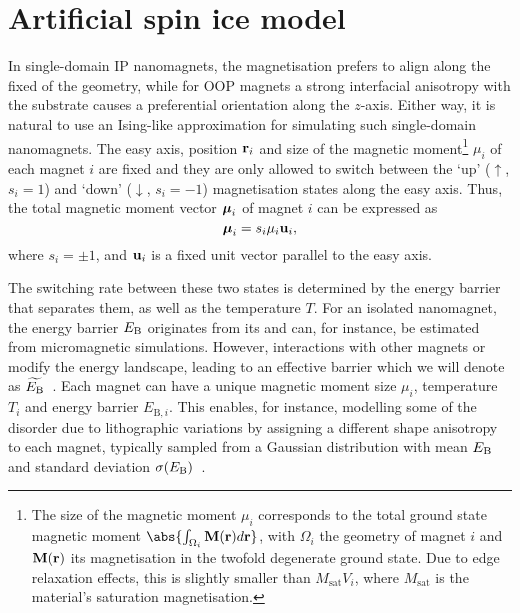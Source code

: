 \newpage
\section{Artificial spin ice model}
In single-domain IP nanomagnets, the magnetisation prefers to align along the fixed  of the geometry, while for OOP magnets a strong interfacial anisotropy with the substrate causes a preferential orientation along the $z$-axis.
Either way, it is natural to use an Ising-like approximation for simulating such single-domain nanomagnets.
The easy axis, position $\boldsymbol{\mathbf{r}}_i$ and size of the magnetic moment\footnote{
	\label{fn:2:moment_integral}
	The size of the magnetic moment $\mu_i$ corresponds to the total ground state magnetic moment $\abs{\int_{\Omega_i} \vc{M}(\vc{r})d\vc{r}}$, with $\Omega_i$ the geometry of magnet $i$ and $\boldsymbol{\mathbf{M}}(\boldsymbol{\mathbf{r}})$ its magnetisation in the twofold degenerate ground state.
	Due to edge relaxation effects, this is slightly smaller than $M_\mathrm{sat} V_i$, where $M_\mathrm{sat}$ is the material's saturation magnetisation.
} $\mu_i$ of each magnet $i$ are fixed and they are only allowed to switch between the `up' ($\uparrow$, $s_i=1$) and `down' ($\downarrow$, $s_i=-1$) magnetisation states along the easy axis.
Thus, the total magnetic moment vector $\boldsymbol{\mathbf{\mu}}_i$ of magnet $i$ can be expressed as
\begin{equation}
	\boldsymbol{\mathbf{\mu}}_i = s_i \mu_i \boldsymbol{\mathbf{u}}_i \mathrm{,}
\end{equation}
where $s_i = \pm 1$, and $\boldsymbol{\mathbf{u}}_i$ is a fixed unit vector parallel to the easy axis. \par
The switching rate between these two states is determined by the energy barrier that separates them, as well as the temperature $T$.
For an isolated nanomagnet, the energy barrier $E_\mathrm{B}$ originates from its  and can, for instance, be estimated from micromagnetic simulations.
However, interactions with other magnets or  modify the energy landscape, leading to an effective barrier which we will denote as $\widetilde{E_\mathrm{B}}$~\cite{leo2021chiral}.
Each magnet can have a unique magnetic moment size $\mu_i$, temperature $T_i$ and energy barrier $E_{\mathrm{B},i}$.
This enables, for instance, modelling some of the disorder due to lithographic variations by assigning a different shape anisotropy to each magnet, typically sampled from a Gaussian distribution with mean $E_\mathrm{B}$ and standard deviation $\sigma(E_\mathrm{B})$~\cite{DisorderGroundStateASI}. \\\par

